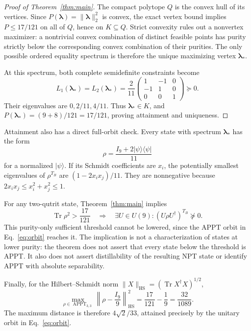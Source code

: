 \documentclass[aps,pra,onecolumn,notitlepage,10pt,amsmath,amssymb,longbibliography,nofootinbib]{revtex4-2}
\newcommand{\Tr}{\operatorname{Tr}}
\newcommand{\APPT}{\operatorname{APPT}}
\newcommand{\lam}{\boldsymbol{\lambda}}
\begin{document}
\begin{proof}[Proof of Theorem~\ref{thm:main}]
The compact polytope $Q$ is the convex hull of its vertices. Since
$P(\lam)=\|\lam\|_2^2$ is convex, the exact vertex bound implies
$P\leq17/121$ on all of $Q$, hence on $K\subseteq Q$.
Strict convexity rules out a nonvertex maximizer: a nontrivial convex
combination of distinct feasible points has purity strictly below the
corresponding convex combination of their purities. The only possible ordered
equality spectrum is therefore the unique maximizing vertex $\lam_*$.

At this spectrum, both complete semidefinite constraints become
\begin{equation}
 L_1(\lam_*)=L_2(\lam_*)=
 \frac2{11}\begin{pmatrix}1&-1&0\\-1&1&0\\0&0&1\end{pmatrix}\succeq0.
 \label{eq:attain}
\end{equation}
Their eigenvalues are $0,2/11,4/11$. Thus $\lam_*\in K$, and
$P(\lam_*)=(9+8)/121=17/121$, proving attainment and uniqueness.
\end{proof}

Attainment also has a direct full-orbit check. Every state with spectrum
$\lam_*$ has the form
\begin{equation}
 \rho=\frac{I_9+2|\psi\rangle\langle\psi|}{11}
 \label{eq:orbit}
\end{equation}
for a normalized $|\psi\rangle$. If its Schmidt coefficients are $x_i$, the
potentially smallest eigenvalues of $\rho^{T_B}$ are
$(1-2x_ix_j)/11$. They are nonnegative because
$2x_ix_j\leq x_i^2+x_j^2\leq1$.

For any two-qutrit state, Theorem~\ref{thm:main} implies
\begin{equation}
 \Tr\rho^2>\frac{17}{121}\quad\Longrightarrow\quad
 \exists U\in U(9): (U\rho U^\dagger)^{T_B}\not\succeq0.
 \label{eq:NPT}
\end{equation}
This purity-only sufficient threshold cannot be lowered, since the APPT orbit
in Eq.~\eqref{eq:orbit} reaches it. The implication is not a characterization
of states at lower purity: the theorem does not assert that every state below
the threshold is APPT. It also does not assert distillability of the resulting
NPT state or identify APPT with absolute separability.

Finally, for the Hilbert--Schmidt norm
$\|X\|_{\mathrm{HS}}=(\Tr X^\dagger X)^{1/2}$,
\begin{equation}
 \max_{\rho\in\APPT_{3,3}}
    \left\|\rho-\frac{I_9}{9}\right\|_{\mathrm{HS}}^2
       =\frac{17}{121}-\frac19=\frac{32}{1089}.
 \label{eq:radius}
\end{equation}
The maximum distance is therefore $4\sqrt2/33$, attained precisely by the
unitary orbit in Eq.~\eqref{eq:orbit}.
\end{document}
